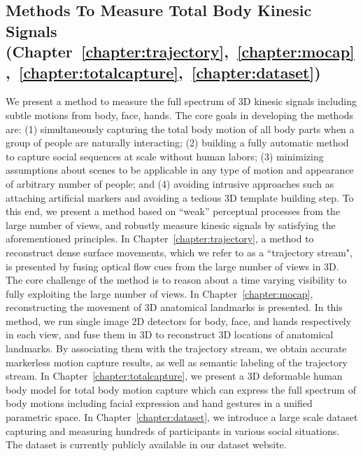 \subsection{Methods To Measure Total Body Kinesic Signals (Chapter~\ref{chapter:trajectory},~\ref{chapter:mocap},~\ref{chapter:totalcapture},~\ref{chapter:dataset})}

We present a method to measure the full spectrum of 3D kinesic signals including subtle motions from body, face, hands. The core goals in developing the methods are: (1) simultaneously capturing the total body motion of all body parts when a group of people are naturally interacting; (2) building a fully automatic method to capture social sequences at scale without human labors; (3) minimizing assumptions about scenes to be applicable in any type of motion and appearance of arbitrary number of people; and (4) avoiding intrusive approaches such as attaching artificial markers and avoiding a tedious 3D template building step. To this end, we present a method based on ``weak'' perceptual processes from the large number of views, and robustly measure kinesic signals by satisfying the aforementioned principles. In Chapter~\ref{chapter:trajectory}, a method to reconstruct dense surface movements, which we refer to as a ``trajectory stream", is presented by fusing optical flow cues from the large number of views in 3D. The core challenge of the method is to reason about a time varying visibility to fully exploiting the large number of views. In Chapter~\ref{chapter:mocap}, reconstructing the movement of 3D anatomical landmarks is presented. In this method, we run single image 2D detectors for body, face, and hands respectively in each view, and fuse them in 3D to reconstruct 3D locations of anatomical landmarks. By associating them with the trajectory stream, we obtain accurate markerless motion capture results, as well as semantic labeling of the trajectory stream.  In Chapter~\ref{chapter:totalcapture}, we present a 3D deformable human body model for total body motion capture which can express the full spectrum of body motions including facial expression and hand gestures in a unified parametric space. In Chapter~\ref{chapter:dataset}, we introduce a large scale dataset capturing and measuring hundreds of participants in various social situations. The dataset is currently publicly available in our dataset website. 


	

